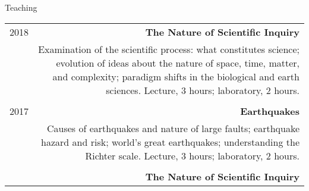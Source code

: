 \begin{rSection}{Teaching}
	\begin{tabular}{L!{\VRule}R}
		2018 & \textbf{The Nature of Scientific Inquiry} \\
		& Examination of the scientific process: what constitutes science; evolution of ideas about the nature of space, time, matter, and complexity; paradigm shifts in the biological and earth sciences. Lecture, 3 hours; laboratory, 2 hours. \\ \\
	
		2017 & \textbf{Earthquakes} \\
		& Causes of earthquakes and nature of large faults; earthquake hazard and risk; world's great earthquakes; understanding the Richter scale. Lecture, 3 hours; laboratory, 2 hours.\\ \\
		
		& \textbf{The Nature of Scientific Inquiry} \\
	\end{tabular}
\end{rSection}